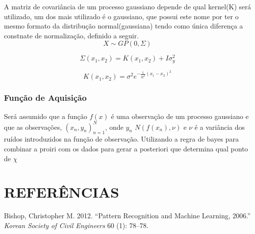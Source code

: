 \documentclass[
	12pt,				%
	twoside,		%
	a4paper,		%
	chapter=TITLE,		   %
	section=TITLE,		   %
	subsection=TITLE,	   %
	subsubsection=TITLE, %
	english,			%
	french,				%
	spanish,			%
	brazil,				%
]{abntex2}
\begin{document}
A matriz de covariância de um processo gaussiano depende de qual
kernel(K) será utilizado, um dos mais utilizado é o gaussiano, que
possui este nome por ter o mesmo formato da distribução
normal(gaussiana) tendo como única diferença a constnate de
normalização, definido a seguir.\\

\[
X \sim GP(0,\Sigma)
\]

\[
\Sigma(x_1,x_2) = K(x_1,x_2) + I\sigma^2_y
\]

\[
K(x_1,x_2) = \sigma^2 e^{-\frac{1}{2l^2}(x_1-x_2)^2}
\]

\hypertarget{funuxe7uxe3o-de-aquisiuxe7uxe3o}{%
\subsection{Função de Aquisição}\label{funuxe7uxe3o-de-aquisiuxe7uxe3o}}

Será assumido que a função \(f(x)\) é uma observação de um processo
gaussiano e que as observações, \((x_n,y_n)_{n=1}^N\), onde
\(y_n \mbox{~} N(f(x_n),\nu)\) e \(\nu\) é a variância dos ruídos
introduzidos na função de observação. Utilizando a regra de bayes para
combinar a proiri com os dados para gerar a posteriori que determina
qual ponto de \(\chi\)

\newpage

\hypertarget{referuxeancias}{%
\chapter*{REFERÊNCIAS}\label{referuxeancias}}

\hypertarget{refs}{}
\leavevmode\hypertarget{ref-bishop2012pattern}{}%
Bishop, Christopher M. 2012. ``Pattern Recognition and Machine Learning,
2006.'' \emph{Korean Society of Civil Engineers} 60 (1): 78--78.

\postextual



\printindex
\end{document}
